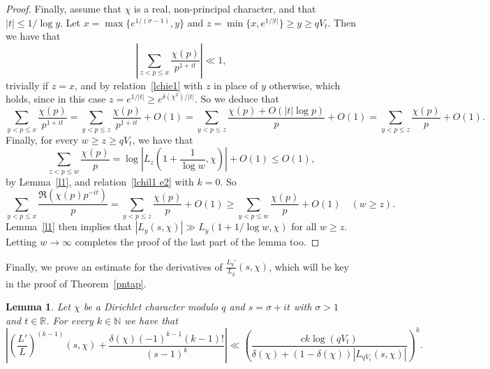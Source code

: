 \documentclass[12pt]{amsart}
\newtheorem{lemma}[theorem]{Lemma}
\theoremstyle{remark}
\newcommand {\SN} {{\mathbb N}}
\newcommand {\SR} {{\mathbb R}}
\numberwithin{equation}{section}
\begin{document}
\begin{proof}
Finally, assume that $\chi$ is a real, non-principal character, and that $|t|\le1/\log y$. Let $x=\max\{e^{1/(\sigma-1)},y\}$ and $z=\min\{x,e^{1/|t|}\}\ge y\ge qV_t$. Then we have that
$$
\left|\sum_{z<p\le x}\frac{\chi(p)}{p^{1+it}}\right|\ll1,
$$
trivially if $z=x$, and by relation~\eqref{lchie1} with $z$ in place of $y$ otherwise, which holds, since in this case $z=e^{1/|t|}\ge e^{\delta(\chi^2)/|t|}$.
So we deduce that
$$
\sum_{y<p\le x}\frac{\chi(p)}{p^{1+it}}
= \sum_{y<p\le z}\frac{\chi(p)}{p^{1+it}} +O(1)
= \sum_{y<p\le z}\frac{\chi(p)+O(|t|\log p)}p + O(1)
= \sum_{y<p\le z}\frac{\chi(p)}p + O(1).
$$
Finally, for every $w\ge z\ge qV_t$, we have that
$$
\sum_{z<p\le w}\frac{\chi(p)}p=\log\left|L_z\left(1+\frac1{\log w},\chi\right)\right|+O(1)\le O(1),
$$
by Lemma~\ref{l1}, and relation~\eqref{lchil1 e2} with $k=0$. So
$$
\sum_{y<p\le x}\frac{\Re(\chi(p)p^{-it})}p = \sum_{y<p\le z}\frac{\chi(p)}p + O(1) \ge \sum_{y<p\le w} \frac{\chi(p)}p+O(1)\quad(w\ge z).
$$
Lemma~\ref{l1} then implies that $|L_y(s,\chi)|\gg L_y(1+1/\log w,\chi)$ for all $w\ge z$. Letting $w\to\infty$ completes the proof of the last part of the lemma too.
\end{proof}

Finally, we prove an estimate for the derivatives of $\frac{L_y'}{L_y}(s,\chi)$, which will be key in the proof of Theorem~\ref{pntap}.

\begin{lemma}\label{lchil3} Let $\chi$ be a Dirichlet character modulo $q$ and $s=\sigma+it$ with $\sigma>1$ and $t\in\SR$. For every $k\in\SN$ we have that
$$
\left|\left(\frac{L'}{L}\right)^{(k-1)}(s,\chi)+\frac{\delta(\chi)(-1)^{k-1}(k-1)!}{(s-1)^k}\right|
\ll\left(\frac{ck\log(qV_t)}{\delta(\chi)+(1-\delta(\chi))|L_{qV_t}(s,\chi)|}\right)^k.
$$
\end{lemma}
\end{document}
